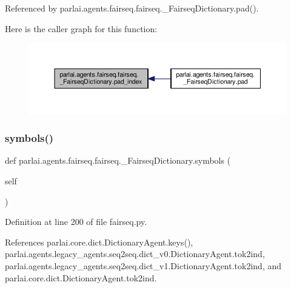Referenced by parlai.\+agents.\+fairseq.\+fairseq.\+\_\+\+Fairseq\+Dictionary.\+pad().

Here is the caller graph for this function\+:
\nopagebreak
\begin{figure}[H]
\begin{center}
\leavevmode
\includegraphics[width=350pt]{classparlai_1_1agents_1_1fairseq_1_1fairseq_1_1__FairseqDictionary_a9712a14ee88222b6e8f97c14326f1082_icgraph}
\end{center}
\end{figure}
\mbox{\label{classparlai_1_1agents_1_1fairseq_1_1fairseq_1_1__FairseqDictionary_a0e88f40d62d0d5de92deb78b7e5597ba}} 
\subsubsection{\texorpdfstring{symbols()}{symbols()}}
{\footnotesize\ttfamily def parlai.\+agents.\+fairseq.\+fairseq.\+\_\+\+Fairseq\+Dictionary.\+symbols (\begin{DoxyParamCaption}\item[{}]{self }\end{DoxyParamCaption})}



Definition at line 200 of file fairseq.\+py.



References parlai.\+core.\+dict.\+Dictionary\+Agent.\+keys(), parlai.\+agents.\+legacy\+\_\+agents.\+seq2seq.\+dict\+\_\+v0.\+Dictionary\+Agent.\+tok2ind, parlai.\+agents.\+legacy\+\_\+agents.\+seq2seq.\+dict\+\_\+v1.\+Dictionary\+Agent.\+tok2ind, and parlai.\+core.\+dict.\+Dictionary\+Agent.\+tok2ind.

